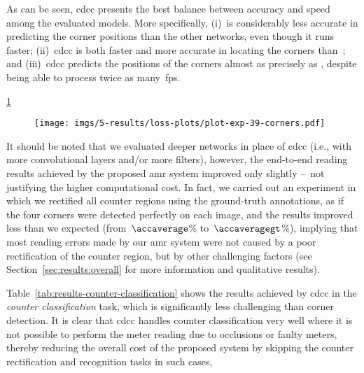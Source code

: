 As can be seen, \gls*{cdcc} presents the best balance between accuracy and speed among the evaluated models.
More specifically, (i)~\smallerlocatenet is considerably less accurate in predicting the corner positions than the other networks, even though it runs faster; (ii)~\gls*{cdcc} is both faster and more accurate in locating the corners than~\locatenet; and
(iii)~\gls*{cdcc} predicts the positions of the corners almost as precisely as \yoohybrid, despite being able to process twice as many~\gls*{fps}. 

\ref{fig:cdcc-net-loss-plot}


\begin{figure}[!htb]
    \centering
    \texttt{[image: imgs/5-results/loss-plots/plot-exp-39-corners.pdf]}
    
    \vspace{-4mm}
    
    \caption{\small {}}
    \label{fig:cdcc-net-loss-plot}
\end{figure}

It should be noted that we evaluated deeper networks in place of \gls*{cdcc} (i.e., with more convolutional layers and/or more filters), however, the end-to-end reading results achieved by the proposed \gls*{amr} system improved only slightly --~not justifying the higher computational cost.
In fact, we carried out an experiment in which we rectified all counter regions using the ground-truth annotations, as if the four corners were detected perfectly on each image, and the results improved less than we expected (from~$\accaverage$\% to~$\accaveragegt$\%), implying that most reading errors made by our \gls*{amr} system were not caused by a poor rectification of the counter region, but by other challenging factors (see Section~\ref{sec:results:overall} for more information and qualitative results). 

Table~\ref{tab:results-counter-classification} shows the results achieved by \gls*{cdcc} in the \textit{counter classification} task, which is significantly less challenging than corner detection.
It is clear that \gls*{cdcc} handles counter classification very well  where it is not possible to perform the meter reading due to occlusions or faulty meters, thereby reducing the overall cost of the proposed system by skipping the counter rectification and recognition tasks in such cases, 


